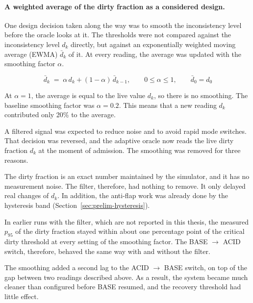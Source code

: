 \paragraph{A weighted average of the dirty fraction as a considered
  design.}\label{sec:approach-nofilter} One design decision taken along the way
was to smooth the inconsistency level before the oracle looks at it. The
thresholds were not compared against the inconsistency level $d_k$ directly, but against an
exponentially weighted moving average (EWMA) $\bar{d}_k$ of it. At every reading,
the average was updated with the smoothing factor $\alpha$.

\begin{equation}
  \bar{d}_k \;=\; \alpha \, d_k + (1 - \alpha) \, \bar{d}_{k-1},
  \qquad 0 \le \alpha \le 1, \qquad \bar{d}_0 = d_0
  \label{eq:ewma}
\end{equation}

At $\alpha = 1$, the average is equal to the live value $d_k$, so there is no
smoothing. The baseline smoothing factor was $\alpha = 0.2$. This means that a
new reading $d_k$ contributed only 20\% to the average.

A filtered signal was expected to reduce noise and to avoid rapid mode switches.
That decision was reversed, and the adaptive oracle now reads the live dirty
fraction $d_k$ at the moment of admission. The smoothing was removed for three
reasons.

\begin{bullets}
  \item[The dirty fraction is an exact value.] The dirty fraction is an exact number
  maintained by the simulator, and it has no measurement noise. The filter,
  therefore, had nothing to remove. It only delayed real changes of $d_k$.
  In addition, the anti-flap work was already done by the hysteresis band
  (Section~\ref{sec:prelim-hysteresis}).

  \item[The switch at the critical dirty threshold was unaffected.] In earlier runs with the filter,
  which are not reported in this thesis, the measured $p_{95}$ of the dirty
  fraction stayed within about one percentage point of the critical dirty threshold at every setting of
  the smoothing factor. The BASE $\to$ ACID switch, therefore, behaved the same
  way with and without the filter.

  \item[It increased the undershoot of the recovery threshold.] The smoothing added
  a second lag to the ACID $\to$ BASE switch, on top of the gap between two
  readings described above. As a result, the
  system became much cleaner than configured before BASE resumed, and the
  recovery threshold had little effect.
\end{bullets}

